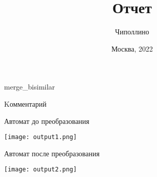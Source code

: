 \documentclass[14pt, russion]{article}
\title{Отчет}
\author{Чиполлино}
\date{Москва, 2022}
\begin{document}
\maketitle
\newpage
merge\_bisimilar

Kомментарий

Автомат до преобразования

\texttt{[image: output1.png]}

Автомат после преобразования

\texttt{[image: output2.png]}

\newpage
\end{document}
